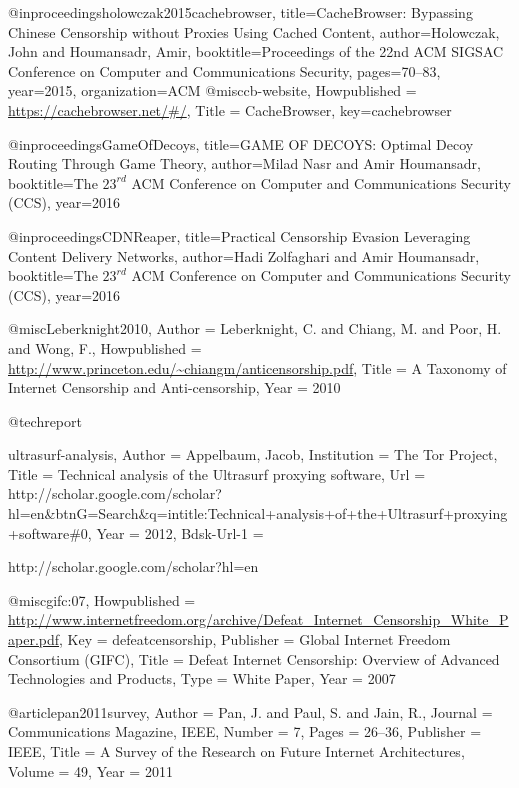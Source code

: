 {{{	
	
	@inproceedings{holowczak2015cachebrowser,
	title={{CacheBrowser: Bypassing Chinese Censorship without Proxies Using Cached Content}},
	author={Holowczak, John and Houmansadr, Amir},
	booktitle={Proceedings of the 22nd ACM SIGSAC Conference on Computer and Communications Security},
	pages={70--83},
	year={2015},
	organization={ACM}
	}
	@misc{cb-website,
	Howpublished = {\url{https://cachebrowser.net/#/}},
	Title = {{CacheBrowser}},
	key={cachebrowser}
	}
	
	@inproceedings{GameOfDecoys,
	title={{GAME OF DECOYS: Optimal Decoy Routing Through Game Theory}},
	author={Milad Nasr and Amir Houmansadr},
	booktitle={The $23^{rd}$ ACM Conference on Computer and Communications Security (CCS)},
	year={2016}
	}
	
	@inproceedings{CDNReaper,
	title={{Practical Censorship Evasion Leveraging Content Delivery Networks}},
	author={Hadi Zolfaghari and Amir Houmansadr},
	booktitle={The $23^{rd}$ ACM Conference on Computer and Communications Security (CCS)},
	year={2016}
	}
	
	@misc{Leberknight2010,
	Author = {Leberknight, C. and Chiang, M. and Poor, H. and Wong, F.},
	Howpublished = {\url{http://www.princeton.edu/~chiangm/anticensorship.pdf}},
	Title = {{A Taxonomy of Internet Censorship and Anti-censorship}},
	Year = {2010}}
	
	@techreport{ultrasurf-analysis,
	Author = {Appelbaum, Jacob},
	Institution = {The Tor Project},
	Title = {{Technical analysis of the Ultrasurf proxying software}},
	Url = {http://scholar.google.com/scholar?hl=en\&btnG=Search\&q=intitle:Technical+analysis+of+the+Ultrasurf+proxying+software\#0},
	Year = {2012},
	Bdsk-Url-1 = {http://scholar.google.com/scholar?hl=en%
	
	@misc{gifc:07,
	Howpublished = {\url{http://www.internetfreedom.org/archive/Defeat\_Internet\_Censorship\_White\_Paper.pdf}},
	Key = {defeatcensorship},
	Publisher = {Global Internet Freedom Consortium (GIFC)},
	Title = {{Defeat Internet Censorship: Overview of Advanced Technologies and Products}},
	Type = {White Paper},
	Year = {2007}}
	
	@article{pan2011survey,
	Author = {Pan, J. and Paul, S. and Jain, R.},
	Journal = {Communications Magazine, IEEE},
	Number = {7},
	Pages = {26--36},
	Publisher = {IEEE},
	Title = {{A Survey of the Research on Future Internet Architectures}},
	Volume = {49},
	Year = {2011}}
	
}}}}}
